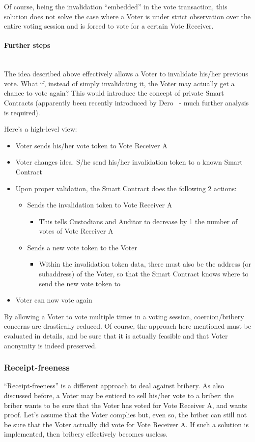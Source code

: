 \documentclass[10pt, letterpaper]{article}
\newcommand{\subsubsubsection}[1]{\paragraph{#1}\mbox{}\\}
\begin{document}
Of course, being the invalidation “embedded” in the vote transaction, this solution does not solve the case where a Voter is under strict observation over the entire voting session and is forced to vote for a certain Vote Receiver.
\subsubsubsection{Further steps}
The idea described above effectively allows a Voter to invalidate his/her previous vote. What if, instead of simply invalidating it, the Voter may actually get a chance to vote again?
This would introduce the concept of private Smart Contracts (apparently been recently introduced by Dero~\cite{Dero:Online} - much further analysis is required).
\bigskip

Here’s a high-level view:
\begin{itemize}
\item Voter sends his/her vote token to Vote Receiver A
\item Voter changes idea. S/he send his/her invalidation token to a known Smart Contract
\item Upon proper validation, the Smart Contract does the following 2 actions:
\begin{itemize}
\item Sends the invalidation token to Vote Receiver A
\begin{itemize}
\item This tells Custodians and Auditor to decrease by 1 the number of votes of Vote Receiver A
\end{itemize}
\item Sends a new vote token to the Voter
\begin{itemize}
\item Within the invalidation token data, there must also be the address (or subaddress) of the Voter, so that the Smart Contract knows where to send the new vote token to
\end{itemize}
\end{itemize}
\item Voter can now vote again
\end{itemize}

By allowing a Voter to vote multiple times in a voting session, coercion/bribery concerns are drastically reduced. Of course, the approach here mentioned must be evaluated in details, and be sure that it is actually feasible and that Voter anonymity is indeed preserved.
\subsubsection{Receipt-freeness}
“Receipt-freeness” is a different approach to deal against bribery. As also discussed before, a Voter may be enticed to sell his/her vote to a briber: the briber wants to be sure that the Voter has voted for Vote Receiver A, and wants proof. Let’s assume that the Voter complies but, even so, the briber can still not be sure that the Voter actually did vote for Vote Receiver A. If such a solution is implemented, then bribery effectively becomes useless.
\bigskip
\end{document}
